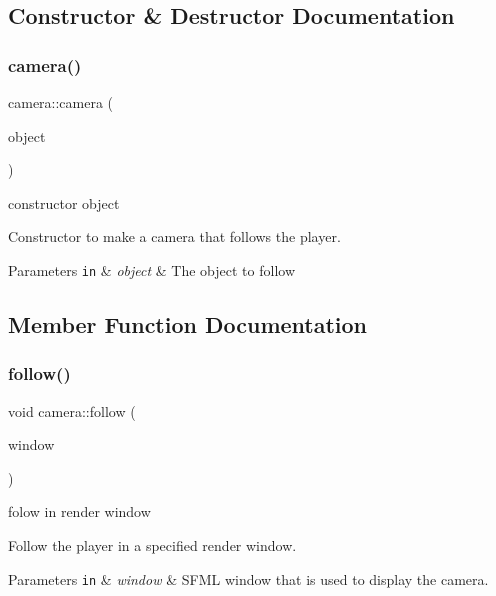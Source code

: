 \subsection{Constructor \& Destructor Documentation}
\mbox{\label{classcamera_ac3c67027b5f4f19c6f12db7d909930b5}} 
\subsubsection{\texorpdfstring{camera()}{camera()}}
{\footnotesize\ttfamily camera\+::camera (\begin{DoxyParamCaption}\item[{\hyperlink{drawable_8hpp_aab5add95f06d2ba25dbfed8eb07274fa}{object\+\_\+ptr}}]{object }\end{DoxyParamCaption})}



constructor object 

Constructor to make a camera that follows the player.


\begin{DoxyParams}[1]{Parameters}
\mbox{\tt in}  & {\em object} & The object to follow \\
\hline
\end{DoxyParams}


\subsection{Member Function Documentation}
\mbox{\label{classcamera_a1bb99501ba67453e0ca86f3c8aef5cb1}} 
\subsubsection{\texorpdfstring{follow()}{follow()}}
{\footnotesize\ttfamily void camera\+::follow (\begin{DoxyParamCaption}\item[{sf\+::\+Render\+Window \&}]{window }\end{DoxyParamCaption})}



folow in render window 

Follow the player in a specified render window.


\begin{DoxyParams}[1]{Parameters}
\mbox{\tt in}  & {\em window} & S\+F\+ML window that is used to display the camera. \\
\hline
\end{DoxyParams}


